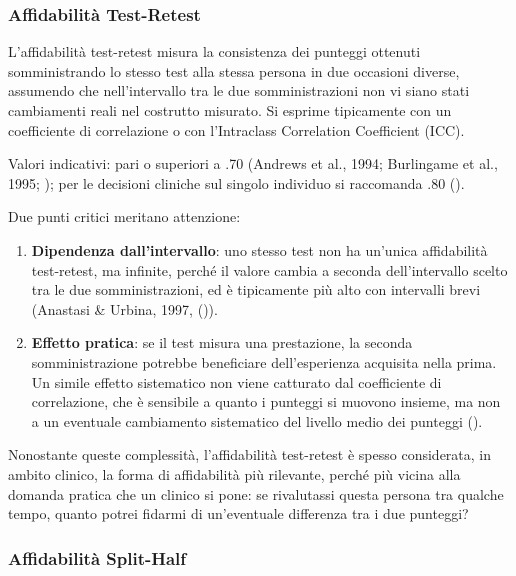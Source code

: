\documentclass[
  italian,
  letterpaper,
  paper=6in:9in,
  pagesize=pdftex,
  headinclude=on,
  footinclude=on,
  11pt]{scrbook}
\providecommand{\tightlist}{%
  \setlength{\itemsep}{0pt}\setlength{\parskip}{0pt}}
\begin{document}
\subsubsection{Affidabilità
Test-Retest}\label{affidabilituxe0-test-retest}

L'affidabilità test-retest misura la consistenza dei punteggi ottenuti
somministrando lo stesso test alla stessa persona in due occasioni
diverse, assumendo che nell'intervallo tra le due somministrazioni non
vi siano stati cambiamenti reali nel costrutto misurato. Si esprime
tipicamente con un coefficiente di correlazione o con l'Intraclass
Correlation Coefficient (ICC).

Valori indicativi: pari o superiori a .70 (Andrews et al., 1994;
Burlingame et al., 1995; \cite{slick2006psychometrics}); per le
decisioni cliniche sul singolo individuo si raccomanda .80
(\cite{sattler2001assessment}).

Due punti critici meritano attenzione:

\begin{enumerate}
\def\labelenumi{\arabic{enumi}.}
\tightlist
\item
  \textbf{Dipendenza dall'intervallo}: uno stesso test non ha un'unica
  affidabilità test-retest, ma infinite, perché il valore cambia a
  seconda dell'intervallo scelto tra le due somministrazioni, ed è
  tipicamente più alto con intervalli brevi (Anastasi \& Urbina, 1997,
  (\cite{slick2006psychometrics})).
\item
  \textbf{Effetto pratica}: se il test misura una prestazione, la
  seconda somministrazione potrebbe beneficiare dell'esperienza
  acquisita nella prima. Un simile effetto sistematico non viene
  catturato dal coefficiente di correlazione, che è sensibile a quanto i
  punteggi si muovono insieme, ma non a un eventuale cambiamento
  sistematico del livello medio dei punteggi
  (\cite{slick2006psychometrics}).
\end{enumerate}

Nonostante queste complessità, l'affidabilità test-retest è spesso
considerata, in ambito clinico, la forma di affidabilità più rilevante,
perché più vicina alla domanda pratica che un clinico si pone: se
rivalutassi questa persona tra qualche tempo, quanto potrei fidarmi di
un'eventuale differenza tra i due punteggi?

\subsubsection{Affidabilità
Split-Half}\label{affidabilituxe0-split-half}
\end{document}
